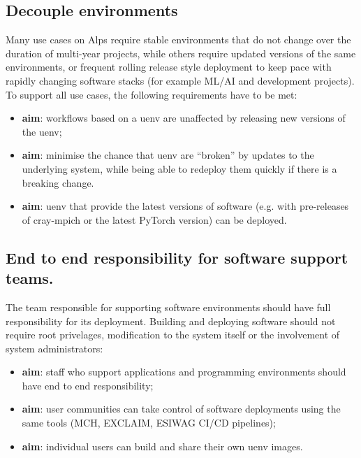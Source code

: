 \subsection{Decouple environments}

Many use cases on Alps require stable environments that do not change over the duration of multi-year projects,
while others require updated versions of the same environments, or frequent rolling release style deployment to keep pace with rapidly changing software stacks (for example ML/AI and development projects).
To support all use cases, the following requirements have to be met:
\begin{itemize}
    \item \textbf{aim}: workflows based on a uenv are unaffected by releasing new versions of the uenv;
    \item \textbf{aim}: minimise the chance that uenv are ``broken'' by updates to the underlying system, while being able to redeploy them quickly if there is a breaking change.
    \item \textbf{aim}: uenv that provide the latest versions of software (e.g. with pre-releases of cray-mpich or the latest PyTorch version) can be deployed.
\end{itemize}

\subsection{End to end responsibility for software support teams.}

The team responsible for supporting software environments should have full responsibility for its deployment.
Building and deploying software should not require root privelages, modification to the system itself or the involvement of system administrators:
\begin{itemize}
    \item \textbf{aim}: staff who support applications and programming environments should have end to end responsibility;
    \item \textbf{aim}: user communities can take control of software deployments using the same tools (MCH, EXCLAIM, ESIWAG CI/CD pipelines);
    \item \textbf{aim}: individual users can build and share their own uenv images.
\end{itemize}

